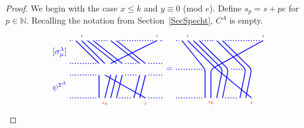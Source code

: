 \documentclass[twoside,11pt,reqno,letter]{amsart}
\numberwithin{equation}{section}
\theoremstyle{definition}  %
\newcommand{\N}{\mathbb{N}}
\newcommand{\0}{{\bar 0}}
\newcommand{\1}{{\bar 1}}
\newcommand{\la}{\lambda}
\newcommand{\si}{\sigma}
\def\T{{\mathtt T}}
\newenvironment{braid}{%
  \begin{tikzpicture}[baseline=6mm,blue,line width=1pt, scale=0.4,
                      draw/.append style={rounded corners},
                      every node/.append style={font=\tiny}]%
  }{\end{tikzpicture}
}
\begin{document}
{\begin{proof}
  We begin with the case $x \leq k$ and $y \equiv 0$ (mod $e$). Define $s_p = s + pe$ for $p \in \N$. Recalling the notation from Section~\ref{SecSpecht}, $C^A$ is empty.
\begin{equation}\label{eq:Gar_st}
  \begin{braid}\tikzset{scale=0.6,baseline=12mm}
    \draw(0,8)node[left,font=\normalsize]{$[\si^\la_\mu]$};
    \draw(0,2)node[left,font=\normalsize]{$\psi^{\T^A}$};
    \draw(1,10)--(5,6); \draw(5,4)--(5,0);
    \draw(2,10)node[above]{$i$}--(6,6); \draw(6,4)--(13,0); \draw(13,-1)node[color=red]{$t$}; 
    \draw(15,10)node[above]{$i$}--(7,6); \draw(7,4)--(6,0); \draw(6,-1)node[color=red]{$s_0$}; 
    \draw(3,10)--(8,6); \draw(8,4)--(7,0);
    \draw(4,10)--(9,6); \draw(9,4)--(8,0);
    \draw(7,10)--(12,6); \draw(12,4)--(11,0);
    \draw(8,10)--(13,6); \draw(13,4)--(12,0);
    \draw[dotted](0,10)--(0.5,10);
    \draw[dotted](0,6)--(4.5,6);
    \draw[dotted](0,4)--(4.5,4);
    \draw[dotted](0,0)--(4.5,0);
    \draw[dotted](4.5,10)--(6.5,10);
    \draw[dotted](9.5,6)--(11.5,6);
    \draw[dotted](9.5,4)--(11.5,4);
    \draw[dotted](8.5,0)--(10.5,0);
    \draw[dotted](8.5,10)--(14.5,10);
    \draw[dotted](15.5,10)--(16,10);
    \draw[dotted](13.5,6)--(16,6);
    \draw[dotted](13.5,4)--(16,4);
    \draw[dotted](13.5,0)--(16,0);
  \end{braid}
  \begin{braid}\tikzset{scale=0.6,baseline=12mm}
    \draw(0,5)node[font=\normalsize]{$=$};
  \end{braid}
  \begin{braid}\tikzset{scale=0.6,baseline=12mm}
    \draw[dotted](0,10)--(0.5,10);
    \draw[dotted](0,5)--(4.5,5);
    \draw[dotted](0,0)--(4.5,0);

    \draw(1,10)--(5,5)--(5,0);
    \draw(2,10)node[above]{$i$}--(7,5)--(13,0)node[below,color=red]{$t$};
    \draw(3,10)--(8,5)--(7,0);
    \draw(4,10)--(9,5)--(8,0);

    \draw[dotted](4.5,10)--(6.5,10);
    \draw[dotted](9.5,5)--(11.5,5);
    \draw[dotted](8.5,0)--(10.5,0);

    \draw(7,10)--(12,5)--(11,0);
    \draw(8,10)--(13,5)--(12,0);

    \draw[dotted](8.5,10)--(14.5,10);

    \draw(15,10)node[above]{$i$}--(6,5)--(6,0)node[below,color=red]{$s_0$};


\end{braid}
\end{equation}
\end{proof}}
\end{document}
